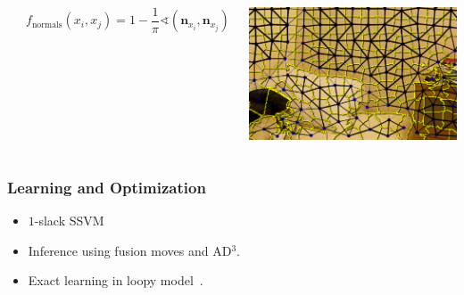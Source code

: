 \documentclass[final,ignorenonframetext,compress]{beamer}
\begin{document}
\begin{frame}
\begin{columns}[c]
\begin{center}
        \end{center}
        \[
            f_\text{normals}(x_i, x_j) = 1 - \frac{1}{\pi}\sphericalangle(\mathbf{n}_{x_i}, \mathbf{n}_{x_j})
         \]
        \begin{center}
            \includegraphics[width=.6\linewidth]{images/normal_feature_bright}
        \end{center}
    \end{columns}
\end{frame}

\begin{frame}
    \frametitle{Learning and Optimization}
    \begin{itemize}
        \item $1$-slack SSVM
        \item Inference using fusion moves and AD$^3$.
        \item Exact learning in loopy model~\citep{mueller2014_exact}.
    \end{itemize}
\end{frame}
\end{document}
